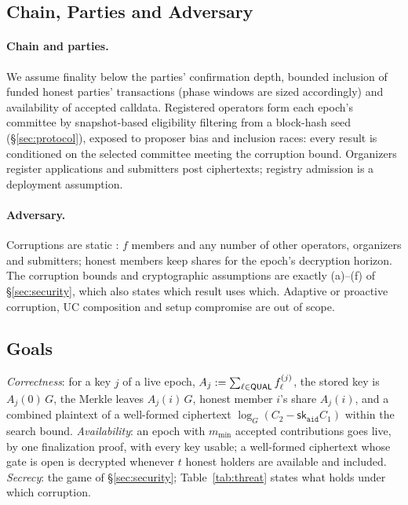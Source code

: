 \subsection{Chain, Parties and Adversary}
\label{subsec:model}

\paragraph{Chain and parties.} We assume finality below the parties' confirmation depth, bounded inclusion of funded honest parties' transactions (phase windows are sized accordingly) and availability of accepted calldata. Registered operators form each epoch's committee by snapshot-based eligibility filtering from a block-hash seed (\S\ref{sec:protocol}), exposed to proposer bias and inclusion races: every result is conditioned on the selected committee meeting the corruption bound. Organizers register applications and submitters post ciphertexts; registry admission is a deployment assumption.

\paragraph{Adversary.} Corruptions are static \cite{canetti1999adaptive}: $f$ members and any number of other operators, organizers and submitters; honest members keep shares for the epoch's decryption horizon. The corruption bounds and cryptographic assumptions are exactly (a)--(f) of \S\ref{sec:security}, which also states which result uses which. Adaptive or proactive corruption, UC composition and setup compromise are out of scope.

\subsection{Goals}
\label{subsec:goals}

\emph{Correctness}: for a key $j$ of a live epoch, $A_j := \sum_{\ell \in \mathsf{QUAL}} f_\ell^{(j)}$, the stored key is $A_j(0)\,G$, the Merkle leaves $A_j(i)\,G$, honest member $i$'s share $A_j(i)$, and a combined plaintext of a well-formed ciphertext $\log_G(C_2 - \mathsf{sk}_{\mathtt{aid}} C_1)$ within the search bound. \emph{Availability}: an epoch with $m_{\min}$ accepted contributions goes live, by one finalization proof, with every key usable; a well-formed ciphertext whose gate is open is decrypted whenever $t$ honest holders are available and included. \emph{Secrecy}: the game of \S\ref{sec:security}; Table~\ref{tab:threat} states what holds under which corruption.

